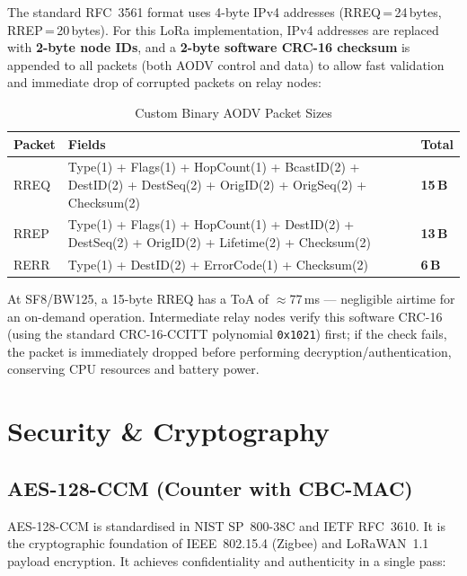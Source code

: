 \documentclass[12pt,a4paper]{article}
\begin{document}
The standard RFC~3561 format uses 4-byte IPv4 addresses (RREQ\,=\,24\,bytes, RREP\,=\,20\,bytes). For this LoRa implementation, IPv4 addresses are replaced with \textbf{2-byte node IDs}, and a \textbf{2-byte software CRC-16 checksum} is appended to all packets (both AODV control and data) to allow fast validation and immediate drop of corrupted packets on relay nodes:

\begin{table}[h!]
\centering
\caption{Custom Binary AODV Packet Sizes}
\begin{tabular}{L{2cm} L{9cm} C{2cm}}
\toprule
\textbf{Packet} & \textbf{Fields} & \textbf{Total} \\
\midrule
RREQ & Type(1) + Flags(1) + HopCount(1) + BcastID(2) + DestID(2) + DestSeq(2) + OrigID(2) + OrigSeq(2) + Checksum(2) & \textbf{15\,B} \\
RREP & Type(1) + Flags(1) + HopCount(1) + DestID(2) + DestSeq(2) + OrigID(2) + Lifetime(2) + Checksum(2) & \textbf{13\,B} \\
RERR & Type(1) + DestID(2) + ErrorCode(1) + Checksum(2) & \textbf{6\,B} \\
\bottomrule
\end{tabular}
\end{table}

At SF8/BW125, a 15-byte RREQ has a ToA of $\approx$77\,ms --- negligible airtime for an on-demand operation. Intermediate relay nodes verify this software CRC-16 (using the standard CRC-16-CCITT polynomial \texttt{0x1021}) first; if the check fails, the packet is immediately dropped before performing decryption/authentication, conserving CPU resources and battery power.

\section{Security \& Cryptography}

\subsection{AES-128-CCM (Counter with CBC-MAC)}

AES-128-CCM is standardised in NIST SP~800-38C and IETF RFC~3610. It is the cryptographic foundation of IEEE~802.15.4 (Zigbee) and LoRaWAN~1.1 payload encryption. It achieves confidentiality and authenticity in a single pass:
\end{document}
